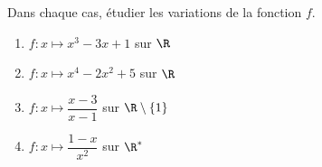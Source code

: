 \documentclass{article}
\begin{document}
Dans chaque cas, étudier les variations de la fonction $f$.

\begin{enumerate}
  \item $f:x\longmapsto x^3-3x+1$ sur $\R$
  \item $f:x\longmapsto x^4-2x^2+5$ sur $\R$
  \item $f:x\longmapsto \dfrac{x-3}{x-1}$ sur $\R\setminus\{1\}$
  \item $f:x\longmapsto \dfrac{1-x}{x^2}$ sur $\R^*$
\end{enumerate}
\end{document}
